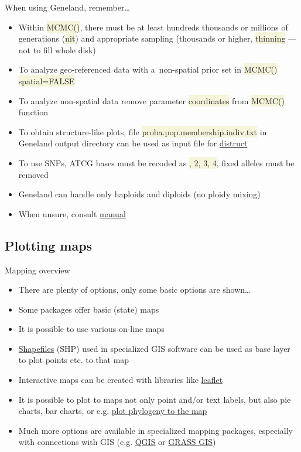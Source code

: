 \documentclass[compress, ucs, xelatex, 11pt, xcolor=svgnames, aspectratio=169,
	hyperref={
		bookmarks=true,
		unicode=true,
		colorlinks=true,
		pdftitle={Molecular data in R},
		plainpages=false,
		pdfauthor={Vojtech Zeisek},
		pdfsubject={Course about phylogeny and evolution in R},
		pdfcreator={XeLaTeX},
		pdfkeywords={R, evolution, phylogeny, molecular data},
		linkcolor=Crimson, %
		anchorcolor=Magenta, %
		citecolor=Magenta, %
		filecolor=Magenta, %
		menucolor=Magenta, %
		urlcolor=DodgerBlue, %
		pdftex},
	url={hyphens, lowtilde} %
	]{beamer}
\renewcommand{\texttt}[1]{\colorbox{Beige}{{\ttfamily #1}}}
\begin{document}
\begin{frame}{When using Geneland, remember\ldots}
	\begin{itemize}
		\item Within \texttt{MCMC()}, there must be at least hundreds thousands or millions of generations (\texttt{nit}) and appropriate sampling (thousands or higher, \texttt{thinning} --- not to fill whole disk)
		\item To analyze geo-referenced data with a~non-spatial prior set in \texttt{MCMC()} \texttt{spatial=FALSE}
		\item To analyze non-spatial data remove parameter \texttt{coordinates} from \texttt{MCMC()} function
		\item To obtain structure-like plots, file \texttt{proba.pop.membership.indiv.txt} in Geneland output directory can be used as input file for \href{https://web.stanford.edu/group/rosenberglab/distruct.html}{distruct}
		\item To use SNPs, ATCG bases must be recoded as \texttt{1, 2, 3, 4}, fixed alleles must be removed
		\item Geneland can handle only haploids and diploids (no ploidy mixing)
		\item When unsure, consult \href{https://i-pri.org/special/Biostatistics/Software/Geneland/Geneland-Doc.pdf}{manual}
	\end{itemize}
\end{frame}

\subsection{Plotting maps}

\begin{frame}{Mapping overview}
	\begin{itemize}
		\item There are plenty of options, only some basic options are shown\ldots
		\item Some packages offer basic (state) maps
		\item It is possible to use various on-line maps
		\item \href{https://en.wikipedia.org/wiki/Shapefile}{Shapefiles} (SHP) used in specialized GIS software can be used as base layer to plot points etc. to that map
		\item Interactive maps can be created with libraries like \href{https://CRAN.R-project.org/package=leaflet}{leaflet}
		\item It is possible to plot to maps not only point and/or text labels, but also pie charts, bar charts, or e.g. \href{http://blog.phytools.org/2019/03/projecting-phylogenetic-tree-onto-map.html}{plot phylogeny to the map}
		\item Much more options are available in specialized mapping packages, especially with connections with GIS (e.g. \href{https://qgis.org/}{QGIS} or \href{https://grass.osgeo.org/}{GRASS GIS})
	\end{itemize}
\end{frame}
\end{document}
